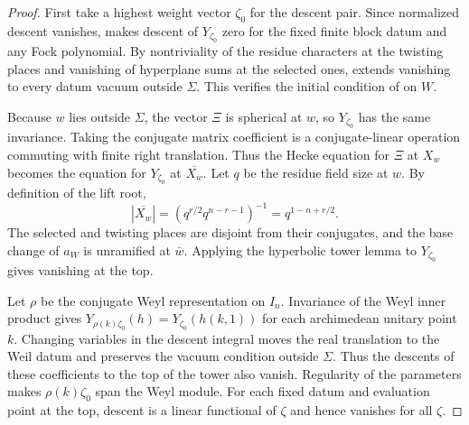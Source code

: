 \begin{proof}
First take a highest weight vector $\zeta_0$ for the descent pair. Since normalized descent vanishes,  makes descent of $Y_{\zeta_0}$ zero for the fixed finite block datum and any Fock polynomial. By nontriviality of the residue characters at the twisting places and vanishing of hyperplane sums at the selected ones,  extends vanishing to every datum vacuum outside $\Sigma$. This verifies the initial condition of  on $W$.

Because $w$ lies outside $\Sigma$, the vector $\Xi$ is spherical at $w$, so $Y_{\zeta_0}$ has the same invariance. Taking the conjugate matrix coefficient is a conjugate-linear operation commuting with finite right translation. Thus the Hecke equation for $\Xi$ at $X_w$ becomes the equation for $Y_{\zeta_0}$ at $\overline{X_w}$. Let $q$ be the residue field size at $w$. By definition of the lift root,
\[
       |\overline{X_w}|=(q^{r/2}q^{n-r-1})^{-1}
                         =q^{1-n+r/2}.
\]
The selected and twisting places are disjoint from their conjugates, and the base change of $a_W$ is unramified at $\bar w$. Applying the hyperbolic tower lemma to $Y_{\zeta_0}$ gives vanishing at the top.

Let $\rho$ be the conjugate Weyl representation on $I_n$. Invariance of the Weyl inner product gives $Y_{\rho(k)\zeta_0}(h)=Y_{\zeta_0}(h(k,1))$ for each archimedean unitary point $k$. Changing variables in the descent integral moves the real translation to the Weil datum and preserves the vacuum condition outside $\Sigma$. Thus the descents of these coefficients to the top of the tower also vanish. Regularity of the parameters makes $\rho(k)\zeta_0$ span the Weyl module. For each fixed datum and evaluation point at the top, descent is a linear functional of $\zeta$ and hence vanishes for all $\zeta$.
\end{proof}

